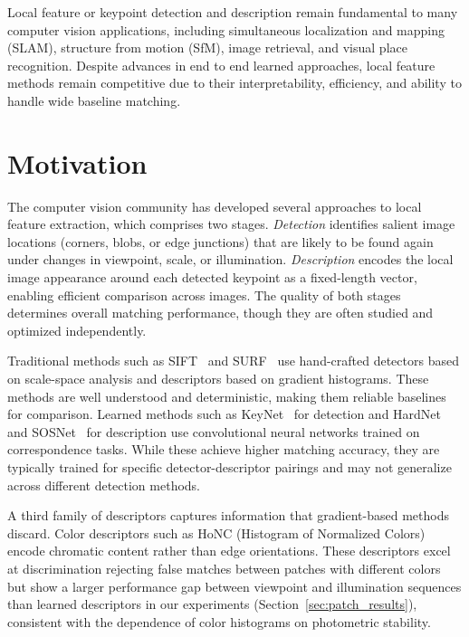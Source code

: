 
Local feature or keypoint detection and description remain fundamental to many computer vision applications, including simultaneous localization and mapping (SLAM), structure from motion (SfM), image retrieval, and visual place recognition. Despite advances in end to end learned approaches, local feature methods remain competitive due to their interpretability, efficiency, and ability to handle wide baseline matching.

\section{Motivation}

The computer vision community has developed several approaches to local feature extraction, which comprises two stages. \textit{Detection} identifies salient image locations (corners, blobs, or edge junctions) that are likely to be found again under changes in viewpoint, scale, or illumination. \textit{Description} encodes the local image appearance around each detected keypoint as a fixed-length vector, enabling efficient comparison across images. The quality of both stages determines overall matching performance, though they are often studied and optimized independently.

Traditional methods such as SIFT~\cite{lowe2004distinctive} and SURF~\cite{bay2006surf} use hand-crafted detectors based on scale-space analysis and descriptors based on gradient histograms. These methods are well understood and deterministic, making them reliable baselines for comparison. Learned methods such as KeyNet~\cite{barroso2019key} for detection and HardNet~\cite{mishchuk2017working} and SOSNet~\cite{tian2019sosnet} for description use convolutional neural networks trained on correspondence tasks. While these achieve higher matching accuracy, they are typically trained for specific detector-descriptor pairings and may not generalize across different detection methods.

A third family of descriptors captures information that gradient-based methods discard. Color descriptors such as HoNC (Histogram of Normalized Colors)~\cite{olson2016keypoint} encode chromatic content rather than edge orientations. These descriptors excel at discrimination rejecting false matches between patches with different colors but show a larger performance gap between viewpoint and illumination sequences than learned descriptors in our experiments (Section~\ref{sec:patch_results}), consistent with the dependence of color histograms on photometric stability.

